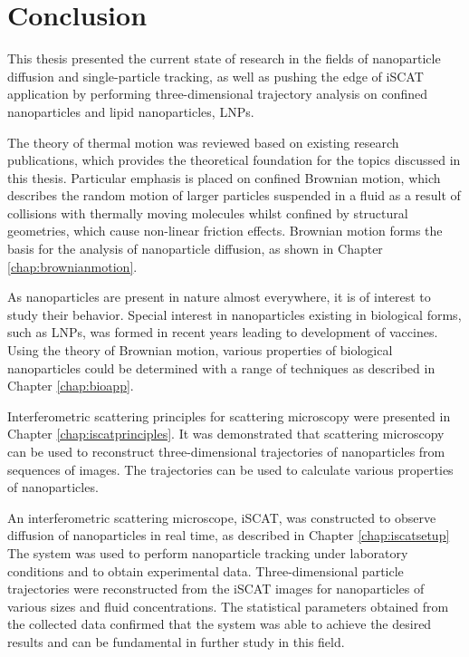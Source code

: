 \section{Conclusion}

This thesis presented the current state of research in the fields of nanoparticle diffusion and single-particle tracking, as well as pushing the edge of iSCAT application by performing three-dimensional trajectory analysis on confined nanoparticles and lipid nanoparticles, LNPs. 

The theory of thermal motion was reviewed based on existing research publications, which provides the theoretical foundation for the topics discussed in this thesis. Particular emphasis is placed on confined Brownian motion, which describes the random motion of larger particles suspended in a fluid as a result of collisions with thermally moving molecules whilst confined by structural geometries, which cause non-linear friction effects. Brownian motion forms the basis for the analysis of nanoparticle diffusion, as shown in Chapter \ref{chap:brownianmotion}.

As nanoparticles are present in nature almost everywhere, it is of interest to study their behavior. Special interest in nanoparticles existing in biological forms, such as LNPs, was formed in recent years leading to development of vaccines. Using the theory of Brownian motion, various properties of biological nanoparticles could be determined with a range of techniques as described in Chapter \ref{chap:bioapp}.

Interferometric scattering principles for scattering microscopy were presented in Chapter \ref{chap:iscatprinciples}. It was demonstrated that scattering microscopy can be used to reconstruct three-dimensional trajectories of nanoparticles from sequences of images.  The trajectories can be used to calculate various properties of nanoparticles.

An interferometric scattering microscope, iSCAT, was constructed to observe diffusion of nanoparticles in real time, as described in Chapter \ref{chap:iscatsetup} The system was used to perform nanoparticle tracking under laboratory conditions and to obtain experimental data. Three-dimensional particle trajectories were reconstructed from the iSCAT images for nanoparticles of various sizes and fluid concentrations.  The statistical parameters obtained from the collected data confirmed that the system was able to achieve the desired results and can be fundamental in further study in this field.

